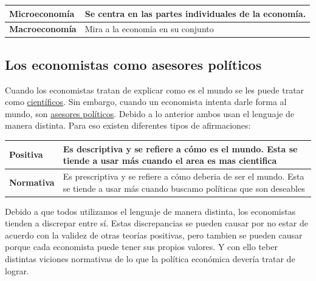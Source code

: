 \endgroup
\begingroup
\setlength{\tabcolsep}{5pt} %
\renewcommand{\arraystretch}{1.5} %
\begin{center}
	\begin{tabular}{l|l}
		{\bf Microeconomía}&Se centra en las partes individuales de la economía.\\ \hline
		{\bf Macroeconomía}&Mira a la economía en su conjunto
	\end{tabular}
\end{center}
\endgroup

\subsection{Los economistas como asesores políticos}
Cuando los economistas tratan de explicar como es el mundo se les puede tratar como \underline{científicos}. Sin embargo, cuando un economista intenta darle forma al mundo, son \underline{asesores políticos}. Debido a lo anterior ambos usan el lenguaje de manera distinta. Para eso existen diferentes tipos de afirmaciones:

\begingroup
\setlength{\tabcolsep}{5pt} %
\renewcommand{\arraystretch}{1.5} %
\begin{center}
\begin{tabular}{p{1.7cm}|p{11cm}}
{\bf Positiva}& Es descriptiva y se refiere a cómo es el mundo. Esta se tiende a usar más cuando el area es mas cientifica\\ \hline
{\bf Normativa}& Es prescriptiva y se refiere a cómo deberia de ser el mundo. Esta se tiende a usar más cuando buscamo políticas que son deseables
\end{tabular}
\end{center}
\endgroup

Debido a que todos utilizamos el lenguaje de manera distinta, los economistas tienden a discrepar entre sí. Estas discrepancias se pueden causar por no estar de acuerdo con la validez de otras teorías positivas, pero tambien se pueden causar porque cada economista puede tener sus propios valores. Y con ello teber distintas viciones normativas de lo que la política económica devería tratar de lograr.
